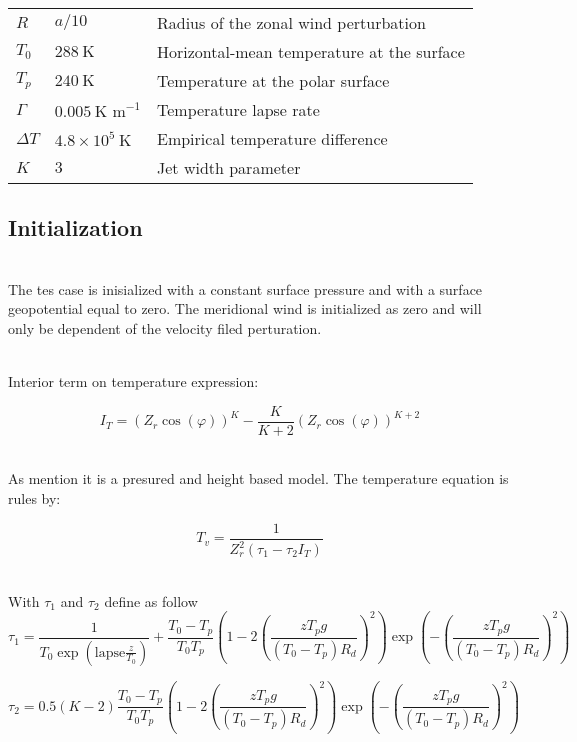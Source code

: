 \documentclass[times,doublespace]{fldauth}
\begin{document}
\begin{table}[h]
\begin{tabular*}{\textwidth}{@{\extracolsep{\fill}}lll}
$R$ & $a / 10$ & Radius of the zonal wind perturbation \\
$T_0$ & $288\ \mbox{K}$ & Horizontal-mean temperature at the surface \\
$T_p$ & $240 \ \mbox{K}$ & Temperature at the polar surface\\
$\Gamma$ & $0.005\ \mbox{K\ m}^{-1}$ & Temperature lapse rate \\
$\Delta T$ & $4.8 \times 10^{5}\ \mbox{K}$ & Empirical temperature difference \\
$K$ & $3$ & Jet width parameter \\
\hline 
\end{tabular*}

\end{table}

\clearpage
\subsection{ Initialization }
 ~\\ The tes case is inisialized with a constant surface pressure and with a surface geopotential equal to zero. The meridional wind is initialized as zero and will only be dependent of the velocity filed perturation. 

~\\Interior term on temperature expression:

\begin{equation*}
I_{T}=(Z_r\cos(\varphi))^K-\frac{K}{K+2}(Z_r\cos(\varphi))^{K+2}
\end{equation*}

~\\ As mention it is a presured and height based model.  The temperature equation is rules by:



\begin{equation*}
T_v=\frac{1}{Z_r^2(\tau_1-\tau_2 I_T)} 
\label{virtTemp}
\end{equation*}


~\\ With $\tau_1$ and $\tau_2$ define as follow
\begin{equation*}
\tau_1=\frac{1}{T_0\exp\left(\text{lapse}\frac{z}{T_0}\right)} + \frac{T_0-T_p}{T_0T_p}\left(1-2\left(\frac{zT_pg}{(T_0-T_p)R_d}\right)^2\right)\exp\left(-\left(\frac{zT_pg}{(T_0-T_p)R_d}\right)^2\right)
\end{equation*}



\begin{equation*}
\tau_2=0.5(K-2)\frac{T_0-T_p}{T_0T_p}\left(1-2\left(\frac{zT_pg}{(T_0-T_p)R_d}\right)^2\right)\exp\left(-\left(\frac{zT_pg}{(T_0-T_p)R_d}\right)^2\right)
\end{equation*}
\end{document}
